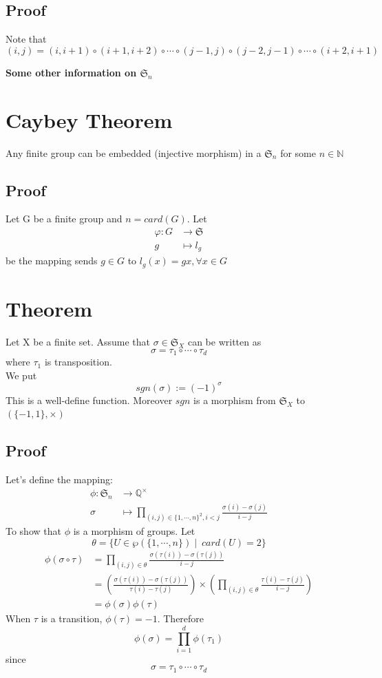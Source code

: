 \documentclass{book}
\begin{document}
\subsection{Proof}
Note that 
$$(i,j)=(i,i+1)\circ(i+1,i+2)\circ\cdots\circ(j-1,j)\circ(j-2,j-1)\circ\cdots\circ(i+2,i+1)$$

\begin{center}
    \textbf{Some other information on $\mathfrak{S}_n$}
\end{center}
\section{Caybey Theorem}
Any finite group can be embedded (injective morphism) in a $\mathfrak{S}_n$ for some $n\in \mathbb{N}$
\subsection*{Proof}
Let G be a finite group and $n=card(G)$. Let
$$
\begin{aligned}
    \varphi:G &\rightarrow \mathfrak{S}\\ g &\mapsto l_g
\end{aligned}$$
be the mapping sends $g\in G$ to $l_g(x)=gx,\forall x\in G$
\section{Theorem}
Let X be a finite set. Assume that $\sigma\in \mathfrak{S}_X$ can be written as $$\sigma=\tau_1\circ\cdots\circ\tau_d$$where $\tau_1$ is transposition.
\\
We put $$sgn(\sigma):=(-1)^\sigma$$
This is a well-define function. Moreover $sgn$ is a morphism from $\mathfrak{S}_X$ to $(\{-1,1\},\times)$
\subsection*{Proof}
Let's define the mapping:
$$\begin{aligned}
    \phi:\mathfrak{S}_n &\rightarrow \mathbb{Q}^\times\\
    \sigma  &\mapsto \prod\limits_{(i,j)\in \{1,\cdots,n\}^2,i<j}\frac{\sigma(i)-\sigma(j)}{i-j}
\end{aligned}$$
To show that $\phi$ is a morphism of groups. Let $$\theta=\{U\in \wp(\{1,\cdots,n\})\mid\ card(U)=2\}$$
$$\begin{aligned}
    \phi(\sigma\circ\tau) &=\prod\limits_{(i,j)\in\theta}\frac{\sigma(\tau(i))-\sigma(\tau(j))}{i-j}\\
    &=(\frac{\sigma(\tau(i))-\sigma(\tau(j))}{\tau(i)-\tau(j)})\times(\prod\limits_{(i,j)\in \theta}\frac{\tau(i)-\tau(j)}{i-j})\\
    &= \phi(\sigma)\phi(\tau)
\end{aligned}$$
When $\tau$ is a transition, $\phi(\tau)=-1$. Therefore
$$\phi(\sigma)=\prod\limits_{i=1}^d\phi(\tau_1)$$
since
$$\sigma=\tau_1\circ\cdots\circ\tau_d$$
\end{document}
